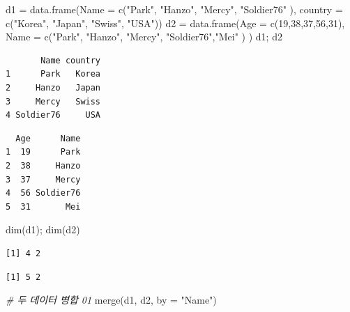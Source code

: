 \documentclass[
  11pt,
]{krantz}
\newenvironment{Shaded}{\begin{snugshade}}{\end{snugshade}}
\newcommand{\AttributeTok}[1]{\textcolor[rgb]{0.61,0.61,0.61}{#1}}
\newcommand{\CommentTok}[1]{\textcolor[rgb]{0.37,0.37,0.37}{\textit{#1}}}
\newcommand{\DecValTok}[1]{\textcolor[rgb]{0.06,0.06,0.06}{#1}}
\newcommand{\FunctionTok}[1]{\textcolor[rgb]{0,0,0}{#1}}
\newcommand{\NormalTok}[1]{#1}
\newcommand{\OtherTok}[1]{\textcolor[rgb]{0.37,0.37,0.37}{#1}}
\newcommand{\StringTok}[1]{\textcolor[rgb]{0.5,0.5,0.5}{#1}}
\begin{document}
\begin{Shaded}
\begin{Highlighting}[]
\NormalTok{d1 }\OtherTok{=} \FunctionTok{data.frame}\NormalTok{(}\AttributeTok{Name =} \FunctionTok{c}\NormalTok{(}\StringTok{"Park"}\NormalTok{, }\StringTok{"Hanzo"}\NormalTok{, }\StringTok{"Mercy"}\NormalTok{, }\StringTok{"Soldier76"}\NormalTok{ ),}
                \AttributeTok{country =} \FunctionTok{c}\NormalTok{(}\StringTok{"Korea"}\NormalTok{, }\StringTok{"Japan"}\NormalTok{, }\StringTok{"Swiss"}\NormalTok{, }\StringTok{"USA"}\NormalTok{))}
\NormalTok{d2 }\OtherTok{=} \FunctionTok{data.frame}\NormalTok{(}\AttributeTok{Age =} \FunctionTok{c}\NormalTok{(}\DecValTok{19}\NormalTok{,}\DecValTok{38}\NormalTok{,}\DecValTok{37}\NormalTok{,}\DecValTok{56}\NormalTok{,}\DecValTok{31}\NormalTok{),}
                \AttributeTok{Name =} \FunctionTok{c}\NormalTok{(}\StringTok{"Park"}\NormalTok{, }\StringTok{"Hanzo"}\NormalTok{, }\StringTok{"Mercy"}\NormalTok{, }\StringTok{"Soldier76"}\NormalTok{,}\StringTok{"Mei"}\NormalTok{ ) )}
\NormalTok{d1; d2}
\end{Highlighting}
\end{Shaded}

\begin{verbatim}
       Name country
1      Park   Korea
2     Hanzo   Japan
3     Mercy   Swiss
4 Soldier76     USA
\end{verbatim}

\begin{verbatim}
  Age      Name
1  19      Park
2  38     Hanzo
3  37     Mercy
4  56 Soldier76
5  31       Mei
\end{verbatim}

\begin{Shaded}
\begin{Highlighting}[]
\FunctionTok{dim}\NormalTok{(d1); }\FunctionTok{dim}\NormalTok{(d2)}
\end{Highlighting}
\end{Shaded}

\begin{verbatim}
[1] 4 2
\end{verbatim}

\begin{verbatim}
[1] 5 2
\end{verbatim}

\begin{Shaded}
\begin{Highlighting}[]
\CommentTok{\# 두 데이터 병합 01}
\FunctionTok{merge}\NormalTok{(d1, d2, }\AttributeTok{by =} \StringTok{"Name"}\NormalTok{)}
\end{Highlighting}
\end{Shaded}
\end{document}
